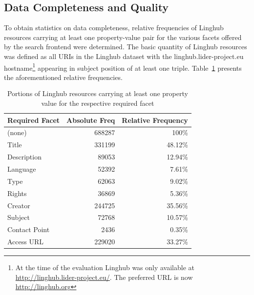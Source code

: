 \documentclass[smallextended]{svjour3}       %
\begin{document}
\subsection{Data Completeness and Quality}

To obtain statistics on data completeness, relative frequencies of Linghub
resources carrying at least one property-value pair for the various facets
offered by the search frontend were determined. The basic quantity of Linghub
resources was defined as all URIs in the Linghub dataset with the
linghub.lider-project.eu hostname\footnote{At the time of the evaluation Linghub
    was only available at \url{http://linghub.lider-project.eu/}. The preferred
URL is now \url{http://linghub.org}} appearing in subject position of at least one
triple. %
Table~\ref{tab:reqinfo} presents the aforementioned relative frequencies.




\begin{table}
    \begin{tabular}{lrr}
      \toprule
      Required Facet & Absolute Freq & Relative Frequency \\
      \midrule
      (none)         & 688287    &   100\% \\
      Title          & 331199    & 48.12\% \\
      Description    & 89053     & 12.94\% \\
      Language       & 52392     &  7.61\% \\
      Type           & 62063     &  9.02\% \\
      Rights         & 36869     &  5.36\% \\
      Creator        & 244725    & 35.56\% \\
      Subject        & 72768     & 10.57\% \\
      Contact Point  & 2436      &  0.35\% \\
      Access URL     & 229020    & 33.27\% \\
      \bottomrule
    \end{tabular}
  \caption{\label{tab:reqinfo} Portions of Linghub resources  carrying at
      least one property value for the respective required facet}
\end{table}
 
\end{document}
